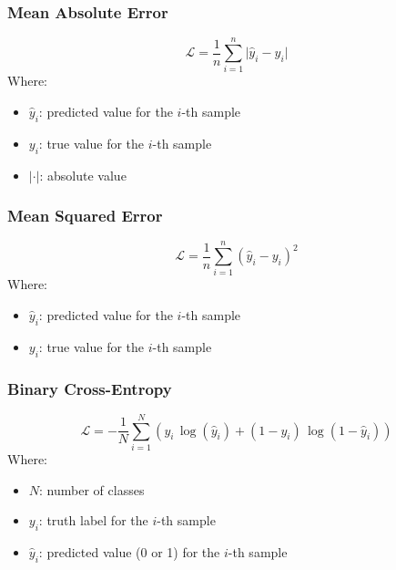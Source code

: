 \documentclass[a4paper]{article}
\newcommand{\abs}[1]{\lvert#1\rvert}
\newcommand{\haty}{\hat{y}}
\newcommand{\ELL}{\mathcal{L}}
\begin{document}
\subsubsection*{Mean Absolute Error}
\begin{equation*}
    \ELL = \frac{1}{n} \sum_{i=1}^{n} \abs{\haty_i - y_i}
\end{equation*}
Where:
\begin{itemize}
    \item $\haty_i$: predicted value for the $i$-th sample
    \item $y_i$: true value for the $i$-th sample
    \item $\abs{\cdot}$: absolute value
\end{itemize}

\subsubsection*{Mean Squared Error}
\begin{equation*}
    \ELL = \frac{1}{n} \sum_{i=1}^{n} (\haty_i - y_i)^2
\end{equation*}
Where:
\begin{itemize}
    \item $\haty_i$: predicted value for the $i$-th sample
    \item $y_i$: true value for the $i$-th sample
\end{itemize}

\subsubsection*{Binary Cross-Entropy}
\begin{equation*}
    \ELL = -\frac{1}{N} \sum_{i=1}^{N} (y_i \, \log(\haty_i) + (1-y_i) \, \log(1-\haty_i))
\end{equation*}
Where:
\begin{itemize}
    \item $N$: number of classes
    \item $y_i$: truth label for the $i$-th sample
    \item $\haty_i$: predicted value (0 or 1) for the $i$-th sample
\end{itemize}
\end{document}
